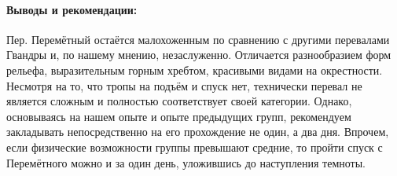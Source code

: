 \paragraph{Выводы и рекомендации:} Пер. Перемётный остаётся малохоженным по сравнению с другими перевалами Гвандры и, по нашему мнению, незаслуженно. Отличается разнообразием форм рельефа, выразительным горным хребтом, красивыми видами на окрестности. Несмотря на то, что тропы на подъём и спуск нет, технически перевал не является сложным и полностью соответствует своей категории. Однако, основываясь на нашем опыте и опыте предыдущих групп, рекомендуем закладывать непосредственно на его прохождение не один, а два дня. Впрочем, если физические возможности группы превышают средние, то пройти спуск с Перемётного можно и за один день, уложившись до наступления темноты.

\clearpage